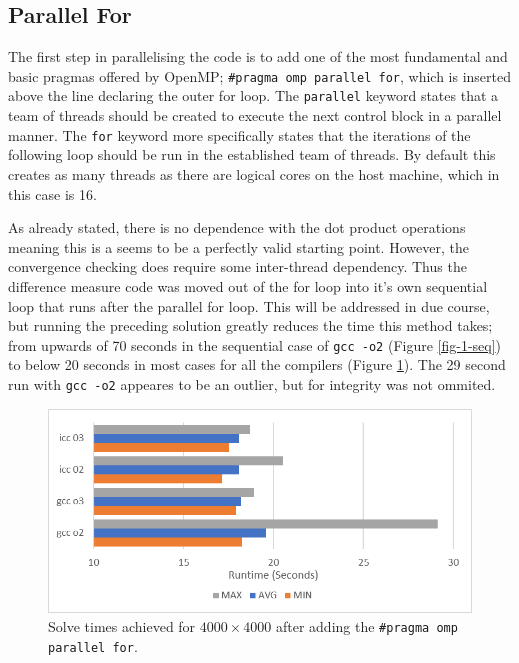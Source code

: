 \documentclass[11pt,twocolumn,a4paper]{article}
\begin{document}
\subsection{Parallel For}
The first step in parallelising the code is to add one of the most fundamental and basic pragmas offered by OpenMP; \texttt{\#pragma omp parallel for}, which is inserted above the line declaring the outer for loop. The \texttt{parallel} keyword states that a team of threads should be created to execute the next control block in a parallel manner. The \texttt{for} keyword more specifically states that the iterations of the following loop should be run in the established team of threads. By default this creates as many threads as there are logical cores on the host machine, which in this case is 16. \par

As already stated, there is no dependence with the dot product operations meaning this is a seems to be a perfectly valid starting point. However, the convergence checking does require some inter-thread dependency. Thus the difference measure code was moved out of the for loop into it's own sequential loop that runs after the parallel for loop. This will be addressed in due course, but running the preceding solution greatly reduces the time this method takes; from upwards of 70 seconds in the sequential case of \texttt{gcc -o2} (Figure \ref{fig-1-seq}) to below 20 seconds in most cases for all the compilers (Figure \ref{fig-2-omp}). The 29 second run with \texttt{gcc -o2} appeares to be an outlier, but for integrity was not ommited. \par

\begin{figure}[h]
        \centering
        \includegraphics[width=0.8\linewidth]{figures/2-OMP-OUTER.png}
        \caption{Solve times achieved for $4000\times4000$ after adding the \texttt{\#pragma omp parallel for}.}
        \label{fig-2-omp}
\end{figure}
\end{document}
